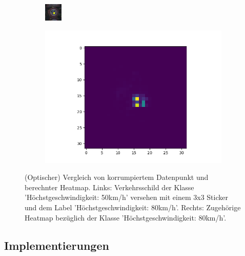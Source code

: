 \documentclass[11pt,a4paper]{article}
\numberwithin{equation}{section}
\begin{document}
	\begin{figure}
		\centering
		\begin{subfigure}{.5\textwidth}
			\centering
			\includegraphics[width=.4\linewidth]{1450_poison}
			
		\end{subfigure}%
		\begin{subfigure}{.5\textwidth}
			\centering
			\includegraphics[width=.7\linewidth]{1450_poison_lrp.png}
			
		\end{subfigure}
		\caption[(Optischer) Vergleich von korrumpiertem Datenpunkt und berechnter Heatmap.]{(Optischer) Vergleich von korrumpiertem Datenpunkt und berechnter Heatmap. Links: Verkehrsschild der Klasse 'Höchstgeschwindigkeit: 50km/h' versehen mit einem 3x3 Sticker und dem Label 'Höchstgeschwindigkeit: 80km/h'. Rechts: Zugehörige Heatmap bezüglich der Klasse 'Höchstgeschwindigkeit: 80km/h'.}		
		\label{vergleich_original_lrp}
	\end{figure}
	\subsection{Implementierungen}
	
\end{document}

